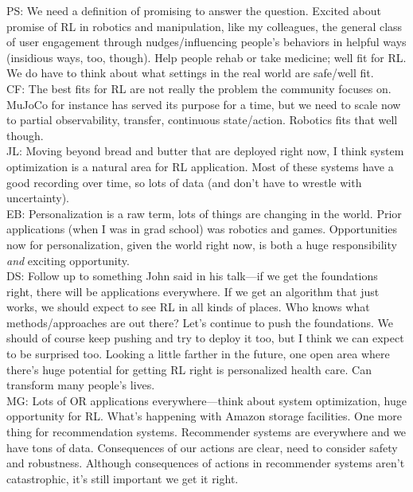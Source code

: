 PS: We need a definition of promising to answer the question. Excited about promise of RL in robotics and manipulation, like my colleagues, the general class of user engagement through nudges/influencing people's behaviors in helpful ways (insidious ways, too, though). Help people rehab or take medicine; well fit for RL. We do have to think about what settings in the real world are safe/well fit. \\

CF: The best fits for RL are not really the problem the community focuses on. MuJoCo for instance has served its purpose for a time, but we need to scale now to partial observability, transfer, continuous state/action. Robotics fits that well though. \\

JL: Moving beyond bread and butter that are deployed right now, I think system optimization is a natural area for RL application. Most of these systems have a good recording over time, so lots of data (and don't have to wrestle with uncertainty). \\

EB: Personalization is a raw term, lots of things are changing in the world. Prior applications (when I was in grad school) was robotics and games. Opportunities now for personalization, given the world right now, is both a huge responsibility {\it and} exciting opportunity. \\

DS: Follow up to something John said in his talk---if we get the foundations right, there will be applications everywhere. If we get an algorithm that just works, we should expect to see RL in all kinds of places. Who knows what methods/approaches are out there? Let's continue to push the foundations. We should of course keep pushing and try to deploy it too, but I think we can expect to be surprised too. Looking a little farther in the future, one open area where there's huge potential for getting RL right is personalized health care. Can transform many people's lives. \\

MG: Lots of OR applications everywhere---think about system optimization, huge opportunity for RL. What's happening with Amazon storage facilities. One more thing for recommendation systems. Recommender systems are everywhere and we have tons of data. Consequences of our actions are clear, need to consider safety and robustness. Although consequences of actions in recommender systems aren't catastrophic, it's still important we get it right. \\

